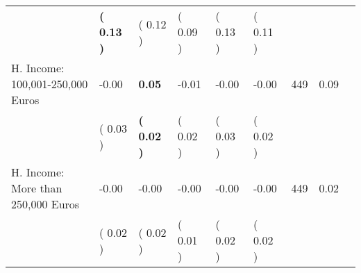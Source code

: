 \begin{tabular}{L{6.2cm} C{1.8cm} C{1.8cm} C{1.8cm} C{1.8cm} C{1.8cm} C{1.8cm} C{0.3cm} C{0.3cm}}
 & \textbf{(     0.13 )} & (     0.12 ) & (     0.09 ) & (     0.13 ) & (     0.11 )  & \\
H. Income: 100,001-250,000 Euros &     -0.00 & \textbf{     0.05} &     -0.01 &     -0.00 &     -0.00  & 449 &       0.09 \\ 
 & (     0.03 ) & \textbf{(     0.02 )} & (     0.02 ) & (     0.03 ) & (     0.02 )  & \\
H. Income: More than 250,000 Euros &     -0.00 &     -0.00 &     -0.00 &     -0.00 &     -0.00  & 449 &       0.02 \\ 
 & (     0.02 ) & (     0.02 ) & (     0.01 ) & (     0.02 ) & (     0.02 )  & \\
\bottomrule
\end{tabular}
